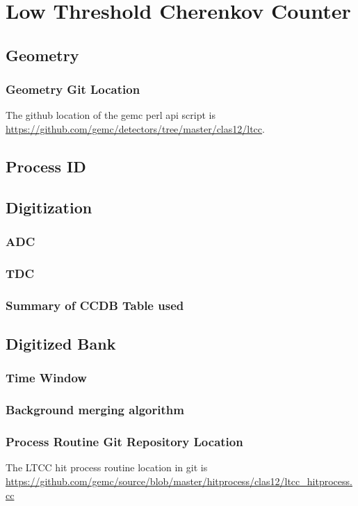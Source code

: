 \section{Low Threshold Cherenkov Counter}


\subsection{Geometry}

\subsubsection{Geometry Git Location}
The github location of the gemc perl api script is \url{https://github.com/gemc/detectors/tree/master/clas12/ltcc}.

\subsection{Process ID}

\subsection{Digitization}


\subsubsection{ADC}
\subsubsection{TDC}

\subsubsection{Summary of CCDB Table used}

\subsection{Digitized Bank}

\subsubsection{Time Window}


\subsubsection{Background merging algorithm}

\subsubsection{Process Routine Git Repository Location}
The LTCC hit process routine location in git is \url{https://github.com/gemc/source/blob/master/hitprocess/clas12/ltcc_hitprocess.cc}
